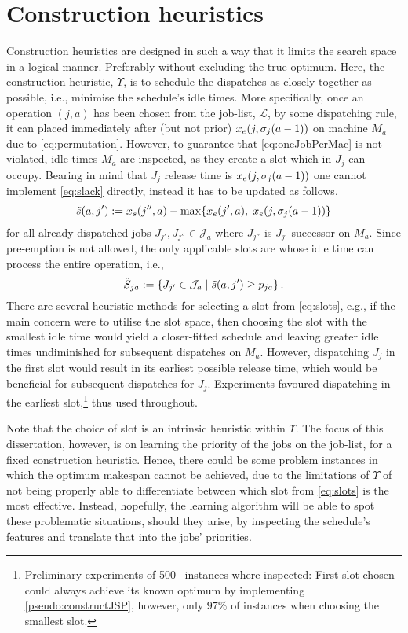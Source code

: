 \section{Construction heuristics}\label{sec:CH}
Construction heuristics are designed in such a way that it limits the search 
space in a logical manner. Preferably without excluding the true optimum. 
Here, the construction heuristic, $\Upsilon$, is to schedule the dispatches as 
closely together as possible, i.e., minimise the schedule's idle times. 
More specifically, once an operation $(j,a)$ has been chosen from the job-list, 
$\mathcal{L}$, by some dispatching rule, it can placed immediately after (but 
not prior) $x_e(j,{\mathbf{\sigma}}_j(a-1))$ on machine $M_a$ due to 
\cref{eq:permutation}.
However, to guarantee that \cref{eq:oneJobPerMac} is not violated, 
idle times $M_a$ are inspected, as they create a slot which in $J_j$ can 
occupy. Bearing in mind that $J_j$ release time is $x_e(j,{\mathbf{\sigma}}_j(a-1))$ one 
cannot implement \cref{eq:slack} directly, instead it has to be updated as 
follows,
\begin{equation}
	\tilde{s}(a,j') := x_s(j'',a)-\max\{x_e(j',a),\;x_e(j,\vsigma_j(a-1))\} %
\end{equation}
for all already dispatched jobs $J_{j'},J_{j''}\in \mathcal{J}_a$ where $J_{j''}$ is $J_{j'}$ successor on $M_a$. Since pre-emption is not allowed, the only applicable slots are whose idle time can process the entire operation, i.e.,
\begin{equation}
	\tilde{S}_{ja} := \condset{J_{j'}\in \mathcal{J}_a}{\tilde{s}(a,j')\geq 
	p_{ja} }\label{eq:slots}.
\end{equation} 
There are several heuristic methods for selecting a slot from 
\cref{eq:slots}, e.g., if the main concern were to utilise the slot space, then 
choosing the slot with the smallest idle time would yield a closer-fitted 
schedule and leaving greater idle times undiminished for subsequent dispatches 
on $M_a$. However, dispatching $J_j$ in the first slot would result in its 
earliest possible release time, which would be beneficial for subsequent 
dispatches for $J_j$. Experiments favoured dispatching in the 
earliest slot,\footnote{Preliminary experiments of 500 \JSP\ instances where 
    inspected: First slot chosen could always achieve its known optimum by 
    implementing \cref{pseudo:constructJSP}, however, only $97\%$ of
    instances when choosing the smallest slot.} 
thus used throughout.

Note that the choice of slot is an intrinsic heuristic within $\Upsilon$.
The focus of this dissertation, however, is on learning the priority of the 
jobs on the job-list, for a fixed construction heuristic. 
Hence, there could be some problem instances in which the optimum makespan 
cannot be achieved, due to the limitations of $\Upsilon$ of not being properly 
able to differentiate between which slot from \cref{eq:slots} is the most 
effective.
Instead, hopefully, the learning algorithm will be able to spot these 
problematic situations, should they arise, by inspecting the schedule's 
features and translate that into the jobs' priorities.

